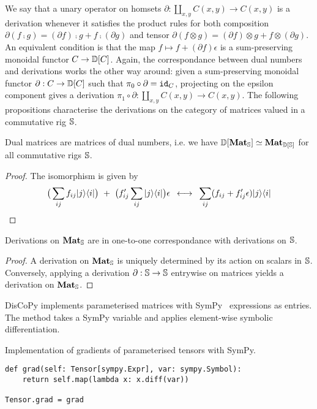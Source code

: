 We say that a unary operator on homsets $\partial : \coprod_{x,y} C(x, y) \to C(x, y)$ is a derivation whenever it satisfies the product rules for both composition
$\partial (f \fcmp g) = (\partial f) \fcmp g + f \fcmp (\partial g)$ and tensor
$\partial (f \otimes g) = (\partial f) \otimes g + f \otimes (\partial g)$.
An equivalent condition is that the map $f \mapsto f + (\partial f) \epsilon$ is a sum-preserving monoidal functor $C \to \D[C]$.
Again, the correspondance between dual numbers and derivations works the other way around: given a sum-preserving monoidal functor $\partial : C \to \D[C]$ such that
$\pi_0 \circ \partial = \id_{C}$, projecting on the epsilon component gives a derivation $\pi_1 \circ \partial : \coprod_{x,y} C(x, y) \to C(x, y)$.
The following propositions characterise the derivations on the category of matrices valued in a commutative rig $\S$.

\begin{proposition}
Dual matrices are matrices of dual numbers, i.e. we have $\D[\mathbf{Mat}_\S] \simeq \mathbf{Mat}_{\D[\S]}$ for all commutative rigs $\S$.
\end{proposition}

\begin{proof}
The isomorphism is given by
$$\big( \sum_{ij} f_{ij} \ket{j} \bra{i} \big)
\ + \ \big( f'_{ij} \sum_{ij} \ket{j}  \bra{i} \big) \epsilon
\s \longleftrightarrow \s
\sum_{ij} (f_{ij} + f'_{ij} \epsilon) \ket{j} \bra{i}$$
\end{proof}

\begin{proposition}
Derivations on $\mathbf{Mat}_\S$ are in one-to-one correspondance with
derivations on $\S$.
\end{proposition}

\begin{proof}
A derivation on $\mathbf{Mat}_\S$ is uniquely determined by its action on
scalars in $\S$. Conversely, applying a derivation $\partial : \S \to \S$
entrywise on matrices yields a derivation on $\mathbf{Mat}_\S$.
\end{proof}

DisCoPy implements parameterised matrices with SymPy~\cite{MeurerEtAl17} expressions as entries.
The method  takes a SymPy variable and applies element-wise symbolic differentiation.

\begin{python}
{\normalfont Implementation of gradients of parameterised tensors with SymPy.}

\begin{verbatim}
def grad(self: Tensor[sympy.Expr], var: sympy.Symbol):
    return self.map(lambda x: x.diff(var))

Tensor.grad = grad
\end{verbatim}
\end{python}

